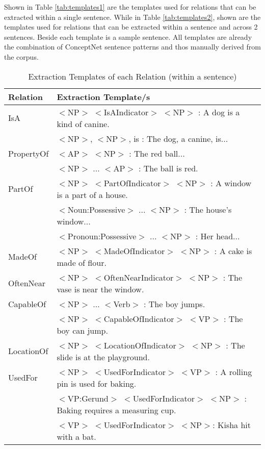 Shown in Table \ref{tab:templates1} are the templates used for relations that can be extracted within a single sentence. While in Table \ref{tab:templates2}, shown are the templates used for relations that can be extracted within a sentence and across 2 sentences. Beside each template is a sample sentence. All templates are already the combination of ConceptNet sentence patterns and thos manually derived from the corpus.

\begin{table}[H]   %
\centering
\caption{Extraction Templates of each Relation (within a sentence)} \vspace{0.25em}
\begin{tabular}{|p{3.5cm}|p{10cm}|} \hline
Relation & Extraction Template/s \\ \hline
IsA					& $<$NP$>$ $<$IsAIndicator$>$ $<$NP$>$ : A dog is a kind of canine. \\
					& $<$NP$>$, $<$NP$>$, is : The dog, a canine, is... \\ \hline
PropertyOf			& $<$AP$>$ $<$NP$>$ : The red ball... \\
					& $<$NP$>$ ... $<$AP$>$ : The ball is red. \\ \hline
PartOf				& $<$NP$>$ $<$PartOfIndicator$>$ $<$NP$>$ : A window is a part of a house. \\
					& $<$Noun:Possessive$>$ ... $<$NP$>$ : The house's window... \\
					& $<$Pronoun:Possessive$>$ ... $<$NP$>$ : Her head... \\ \hline
MadeOf				& $<$NP$>$ $<$MadeOfIndicator$>$ $<$NP$>$ : A cake is made of flour. \\ \hline
OftenNear			& $<$NP$>$ $<$OftenNearIndicator$>$ $<$NP$>$ : The vase is near the window. \\ \hline
CapableOf			& $<$NP$>$ ... $<$Verb$>$ : The boy jumps. \\
					& $<$NP$>$ $<$CapableOfIndicator$>$ $<$VP$>$ : The boy can jump. \\ \hline
LocationOf			& $<$NP$>$ $<$LocationOfIndicator$>$ $<$NP$>$ : The slide is at the playground. \\ \hline
UsedFor				& $<$NP$>$ $<$UsedForIndicator$>$ $<$VP$>$ : A rolling pin is used for baking. \\
					& $<$VP:Gerund$>$ $<$UsedForIndicator$>$ $<$NP$>$ : Baking requires a measuring cup. \\
					& $<$VP$>$ $<$UsedForIndicator$>$ $<$NP$>$: Kisha hit with a bat. \\ \hline

\end{tabular}
\end{table}
